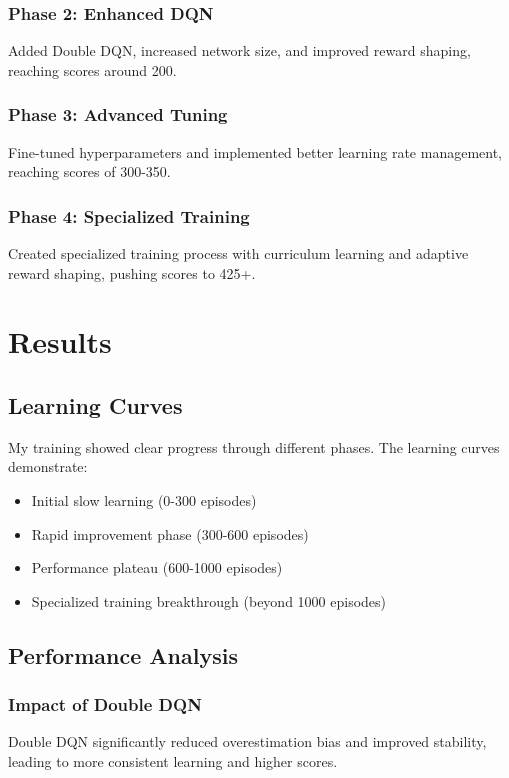 \documentclass[11pt,a4paper]{article}
\begin{document}
\subsubsection{Phase 2: Enhanced DQN}
Added Double DQN, increased network size, and improved reward shaping, reaching scores around 200.

\subsubsection{Phase 3: Advanced Tuning}
Fine-tuned hyperparameters and implemented better learning rate management, reaching scores of 300-350.

\subsubsection{Phase 4: Specialized Training}
Created specialized training process with curriculum learning and adaptive reward shaping, pushing scores to 425+.

\section{Results}

\subsection{Learning Curves}

My training showed clear progress through different phases. The learning curves demonstrate:

\begin{itemize}
    \item Initial slow learning (0-300 episodes)
    \item Rapid improvement phase (300-600 episodes)
    \item Performance plateau (600-1000 episodes)
    \item Specialized training breakthrough (beyond 1000 episodes)
\end{itemize}

\subsection{Performance Analysis}

\subsubsection{Impact of Double DQN}
Double DQN significantly reduced overestimation bias and improved stability, leading to more consistent learning and higher scores.
\end{document}
